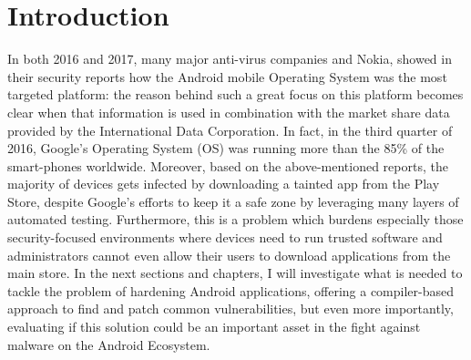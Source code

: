 \chapter{Introduction}
In both 2016 and 2017, many major anti-virus companies and Nokia, showed in their security reports how the Android mobile Operating System was the most targeted platform\cite{kaspersky}\cite{mcafee}\cite{nokia}: the reason behind such a great focus on this platform becomes clear when that information is used in combination with the market share data provided by the International Data Corporation. In fact, in the third quarter of 2016, Google's Operating System (OS) was running more than the 85\% of the smart-phones worldwide\cite{idcshare}. Moreover, based on the above-mentioned reports, the majority of devices gets infected by downloading a tainted app from the Play Store, despite Google's efforts to keep it a safe zone by leveraging many layers of automated testing. Furthermore, this is a problem which burdens especially those security-focused environments where devices need to run trusted software and administrators cannot even allow their users to download applications from the main store. In the next sections and chapters, I will investigate what is needed to tackle the problem of hardening Android applications, offering a compiler-based approach to find and patch common vulnerabilities, but even more importantly, evaluating if this solution could be an important asset in the fight against malware on the Android Ecosystem.

